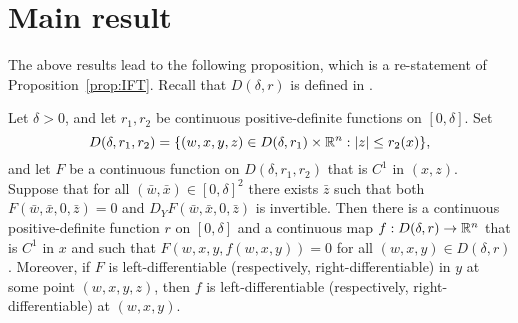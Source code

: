 \section{Main result}

The above results lead to the following proposition, which is a re-statement of
Proposition~\ref{prop:IFT}. Recall that $D(\delta, r)$ is defined in .

\begin{prop}
\label{prop:IFT-re}
Let $\delta > 0$, and let $r_1, r_2$ be continuous positive-definite functions on $[0, \delta]$.
Set
\begin{equation}
    D(\delta, r_1, r_2)
    =
    \{ (w, x, y, z) \in D(\delta, r_1) \times {\mathbb R}^n : |z| \leq r_2(x) \},
\end{equation}
and let $F$ be a continuous function on $D(\delta, r_1, r_2)$ that is $C^1$ in $(x, z)$.
Suppose that for all $(\bar w, \bar x) \in [0, \delta]^2$ there exists $\bar z$
such that both $F(\bar w, \bar x, 0, \bar z) = 0$
and $D_Y F(\bar w, \bar x, 0, \bar z)$ is invertible.
Then there is a continuous positive-definite function $r$ on $[0, \delta]$ and
a continuous map $f : D(\delta, r) \rightarrow {\mathbb R}^n$
that is $C^1$ in $x$
and such that $F(w, x, y, f(w, x, y)) = 0$
for all $(w, x, y) \in D(\delta, r)$.
Moreover, if $F$ is left-differentiable
(respectively, right-differentiable) in $y$ at some point $(w, x, y, z)$,
then $f$ is left-differentiable (respectively, right-differentiable) at $(w, x, y)$.
\end{prop}

